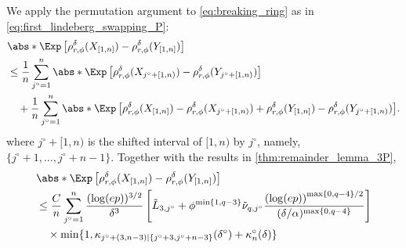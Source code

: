 \documentclass[aos]{imsart}
\begin{document}
\begin{appendix}
\medskip
{} 
We apply the permutation argument to \cref{eq:breaking_ring} as in \cref{eq:first_lindeberg_swapping_P}:
\begin{equation*}
\begin{aligned}
    & \abs*{ \Exp\left[\rho_{r,\phi}^\delta(X_{[1,n]}) - \rho_{r,\phi}^\delta(Y_{[1,n]})\right]} \\
    & \leq \frac{1}{n} \sum_{j^\circ=1}^n \abs*{ \Exp\left[
        \rho_{r,\phi}^\delta(X_{j^\circ+[1,n)}) - \rho_{r,\phi}^\delta(Y_{j^\circ+[1,n)})
    \right]} \\
    & \quad + \frac{1}{n} \sum_{j^\circ=1}^n \abs*{ \Exp\left[ \rho_{r,\phi}^\delta(X_{[1,n]}) - \rho_{r,\phi}^\delta(X_{j^\circ+[1,n)}) + \rho_{r,\phi}^\delta(Y_{[1,n]}) - \rho_{r,\phi}^\delta(Y_{j^\circ+[1,n)})\right]}.
\end{aligned}
\end{equation*}
where $j^\circ+[1,n)$ is the shifted interval of $[1, n)$ by $j^\circ$, namely, $\{j^\circ+1, \dots, j^\circ+n-1\}$. 
Together with the results in \cref{thm:remainder_lemma_3P},
\begin{equation*}
\begin{aligned}
    & \abs*{ \Exp\left[\rho_{r,\phi}^\delta(X_{[1,n]}) - \rho_{r,\phi}^\delta(Y_{[1,n]})\right]} \\
    & \leq \frac{C}{n} \sum_{j^\circ=1}^n \frac{(\log(ep))^{3/2}}{\delta^3} 
    \left[ 
        \tilde{L}_{3,j^\circ} 
        + \phi^{\min\{1, q-3\}} \tilde\nu_{q,j^\circ} \frac{ {(\log(ep))}^{\max\{0, q-4\}/2}}{(\delta/\alpha)^{\max\{0, q-4\}}}
    \right]  \\
    & \quad \times \min\{1, \kappa_{j^\circ+(3,n-3)|\{j^\circ+3,j^\circ+n-3\}}(\delta^\circ) + \kappa^\circ_{n}(\delta)\} \\

\end{aligned}
\end{equation*}
\end{appendix}
\end{document}
